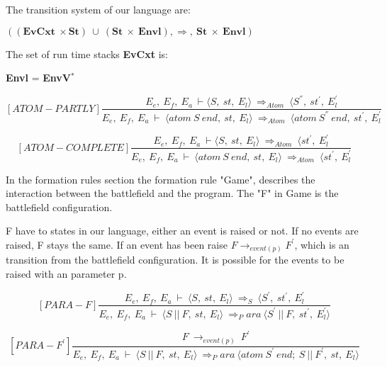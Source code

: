    	The transition system of our language are:
   	 
   	\begin{math}
   		((\boldsymbol{EvCxt} \ \times \boldsymbol{St}) \ \cup \ (\boldsymbol{St} \ \times \ \boldsymbol{Envl}), \Rightarrow, \ \boldsymbol{St} \ \times \ \boldsymbol{Envl})
   	\end{math}
   	
   	The set of run time stacks \textbf{EvCxt} is:
   	
   	\textbf{Envl} = \textbf{EnvV}\begin{math}
   	^*
   	\end{math}
   	
   	\[
   	[ATOM-PARTLY]
   	\dfrac{E_e, \ E_f, \ E_a \ \vdash \langle S, \ st, \ E_l \rangle \ \Rightarrow_{Atom} \ \langle S^{''}, \ st^{'}, \ E_l^{'}}{E_e, \ E_f, \ E_a \ \vdash \ \langle atom \ S \ end, \ st, \ E_l \rangle \ \Rightarrow_{Atom} \ \langle atom \ S^{''} \ end, \ st^{'}, \ E_l^{'}}
   	\]
   	
   	\[
   	[ATOM-COMPLETE]
   	\dfrac{E_e, \ E_f, \ E_a \ \vdash \langle S, \ st, \ E_l \rangle \ \Rightarrow_{Atom} \ \langle st^{'}, \ E_l^{'}}{E_e, \ E_f, \ E_a \ \vdash \ \langle atom \ S \ end, \ st, \ E_l \rangle \ \Rightarrow_{Atom} \ \langle st^{'}, \ E_l^{'}}
   	\]
   	
   	In the formation rules section the formation rule "Game", describes the interaction between the battlefield and the program. The "F" in Game is the battlefield configuration. 
   	
   	F have to states in our language, either an event is raised or not. If no events are raised, F stays the same. If an event has been raise \begin{math} F \rightarrow_{event(p)} F^{'} \end{math}, which is an transition from the battlefield configuration. It is possible for the events to be raised with an parameter p. 
   	
   	\[
   	[PARA-F]
   	\dfrac{E_e, \ E_f, \ E_a \ \vdash \ \langle S, \ st, \ E_l \rangle \ \Rightarrow_S \ \langle S^{'}, \ st^{'}, \ E_l^{'}}{E_e, \ E_f, \ E_a \ \vdash \ \langle S \ || \ F, \ st, \ E_l \rangle \ \Rightarrow_Para \ \langle S^{'} \ || \ F, \ st^{'}, \ E_l^{'} \rangle}
   	\]
   	
   	\[
   	[PARA-F^{'}]
   	\dfrac{F \ \rightarrow_{event(p)} \ F^{'}}{E_e, \ E_f, \ E_a \ \vdash \ \langle S \ || \ F, \ st, \ E_l \rangle \ \Rightarrow_Para \ \langle atom \ S^{'} \ end; \ S \ || \ F^{'}, \ st, \ E_l \rangle}
   	\]
   	
